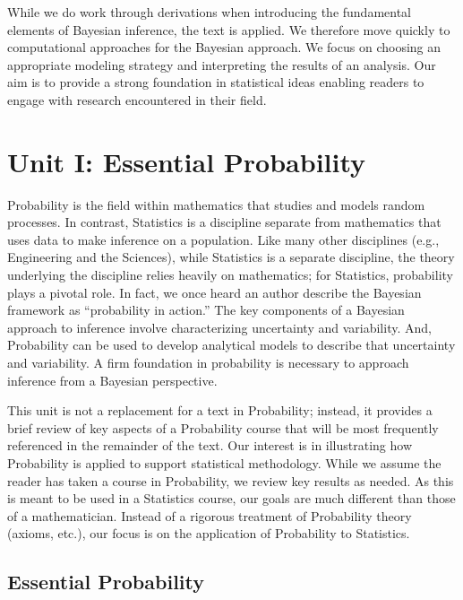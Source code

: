 \documentclass[
  letterpaper,
  DIV=11,
  numbers=noendperiod]{scrreprt}
\theoremstyle{definition}
\theoremstyle{plain}
\theoremstyle{definition}
\theoremstyle{remark}
\begin{document}
While we do work through derivations when introducing the fundamental
elements of Bayesian inference, the text is applied. We therefore move
quickly to computational approaches for the Bayesian approach. We focus
on choosing an appropriate modeling strategy and interpreting the
results of an analysis. Our aim is to provide a strong foundation in
statistical ideas enabling readers to engage with research encountered
in their field.

\part{Unit I: Essential Probability}

Probability is the field within mathematics that studies and models
random processes. In contrast, Statistics is a discipline separate from
mathematics that uses data to make inference on a population. Like many
other disciplines (e.g., Engineering and the Sciences), while Statistics
is a separate discipline, the theory underlying the discipline relies
heavily on mathematics; for Statistics, probability plays a pivotal
role. In fact, we once heard an author describe the Bayesian framework
as ``probability in action.'' The key components of a Bayesian approach
to inference involve characterizing uncertainty and variability. And,
Probability can be used to develop analytical models to describe that
uncertainty and variability. A firm foundation in probability is
necessary to approach inference from a Bayesian perspective.

This unit is not a replacement for a text in Probability; instead, it
provides a brief review of key aspects of a Probability course that will
be most frequently referenced in the remainder of the text. Our interest
is in illustrating how Probability is applied to support statistical
methodology. While we assume the reader has taken a course in
Probability, we review key results as needed. As this is meant to be
used in a Statistics course, our goals are much different than those of
a mathematician. Instead of a rigorous treatment of Probability theory
(axioms, etc.), our focus is on the application of Probability to
Statistics.

\hypertarget{sec-fundamentals}{%
\chapter{Essential Probability}\label{sec-fundamentals}}

\providecommand{\norm}[1]{\lVert#1\rVert}
\providecommand{\abs}[1]{\lvert#1\rvert}
\providecommand{\iid}{\stackrel{\text{IID}}{\sim}}
\providecommand{\ind}{\stackrel{\text{Ind}}{\sim}}
\end{document}
